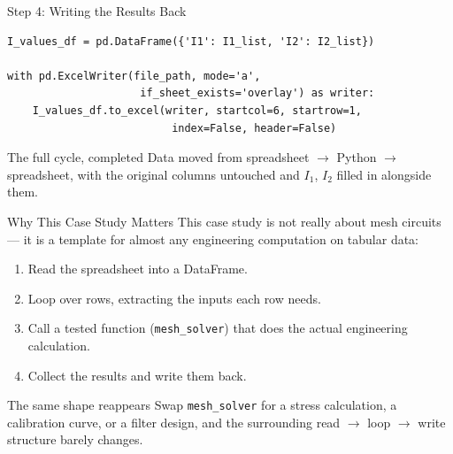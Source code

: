 \documentclass[9pt,aspectratio=169,xcolor=table]{beamer}
\begin{document}
\begin{frame}[fragile]{Step 4: Writing the Results Back}
    \leavevmode
\begin{lstlisting}
I_values_df = pd.DataFrame({'I1': I1_list, 'I2': I2_list})

with pd.ExcelWriter(file_path, mode='a',
                     if_sheet_exists='overlay') as writer:
    I_values_df.to_excel(writer, startcol=6, startrow=1,
                          index=False, header=False)
\end{lstlisting}

    \vspace{3mm}
    \begin{alertblock}{The full cycle, completed}
        Data moved from spreadsheet $\to$ Python $\to$ spreadsheet,
        with the original columns untouched and $I_1$, $I_2$ filled
        in alongside them.
    \end{alertblock}
\end{frame}

\begin{frame}{Why This Case Study Matters}
    \leavevmode
    \small
    This case study is not really about mesh circuits --- it is a
    template for almost any engineering computation on tabular data:

    \vspace{2mm}
    \begin{enumerate}
        \item Read the spreadsheet into a DataFrame.
        \item Loop over rows, extracting the inputs each row needs.
        \item Call a tested function (\texttt{mesh\_solver}) that
              does the actual engineering calculation.
        \item Collect the results and write them back.
    \end{enumerate}

    \vspace{3mm}
    \begin{block}{The same shape reappears}
        Swap \texttt{mesh\_solver} for a stress calculation, a
        calibration curve, or a filter design, and the surrounding
        read $\to$ loop $\to$ write structure barely changes.
    \end{block}
\end{frame}
\end{document}
